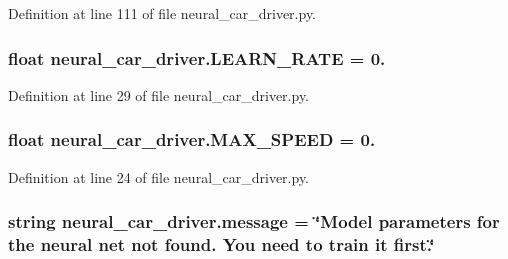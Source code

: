 Definition at line 111 of file neural\+\_\+car\+\_\+driver.\+py.

\subsubsection[{\texorpdfstring{L\+E\+A\+R\+N\+\_\+\+R\+A\+TE}{LEARN_RATE}}]{\setlength{\rightskip}{0pt plus 5cm}float neural\+\_\+car\+\_\+driver.\+L\+E\+A\+R\+N\+\_\+\+R\+A\+TE = 0.}\hypertarget{namespaceneural__car__driver_a3873d214234a7685f0003bdedb09a3b5}{}\label{namespaceneural__car__driver_a3873d214234a7685f0003bdedb09a3b5}


Definition at line 29 of file neural\+\_\+car\+\_\+driver.\+py.

\subsubsection[{\texorpdfstring{M\+A\+X\+\_\+\+S\+P\+E\+ED}{MAX_SPEED}}]{\setlength{\rightskip}{0pt plus 5cm}float neural\+\_\+car\+\_\+driver.\+M\+A\+X\+\_\+\+S\+P\+E\+ED = 0.}\hypertarget{namespaceneural__car__driver_af2fef2c19127bf0b4e990d28542c7b6f}{}\label{namespaceneural__car__driver_af2fef2c19127bf0b4e990d28542c7b6f}


Definition at line 24 of file neural\+\_\+car\+\_\+driver.\+py.

\subsubsection[{\texorpdfstring{message}{message}}]{\setlength{\rightskip}{0pt plus 5cm}string neural\+\_\+car\+\_\+driver.\+message = \char`\"{}Model parameters for the neural net not found. You need to train it first.\char`\"{}}\hypertarget{namespaceneural__car__driver_a65829420a3ca6888c41c04e36ad0c4fb}{}\label{namespaceneural__car__driver_a65829420a3ca6888c41c04e36ad0c4fb}


